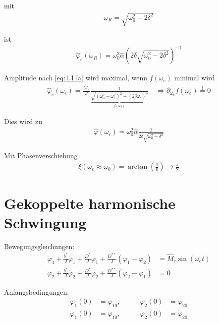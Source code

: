         mit
        \begin{align}
            \omega_R = \sqrt{\omega_0^2 - 2\delta^2}\label{eq:1.14}
        \end{align}

        ist
        \begin{align}
            \hat{\varphi}_e(\omega_R) = \omega_0^2 \hat{\alpha}\left(2\delta\sqrt{\omega_0^2 - 2\delta^2}\right)^{-1}\label{eq:1.14a}
        \end{align}

        Amplitude nach \cref{eq:1.11a} wird maximal, wenn \(f(\omega_e)\) minimal wird
        \begin{align}
            \hat{\varphi}_e(\omega_e) = \frac{\hat{M}_e}{J} \frac{1}{\underbrace{\sqrt{(\omega_0^2 - \omega_e^2)^2+(2\delta\omega_e)^2}}_{f(\omega_e)}} \quad \Rightarrow \partial_{\omega_e} f(\omega_e) \overset{!}{=} 0\nonumber
        \end{align}

        Dies wird zu
        \begin{align}
            \hat{\varphi}(\omega_e) = \omega_0^2 \hat{\alpha} \frac{1}{2\delta\sqrt{\omega_0^2-\delta^2}}\nonumber
        \end{align}

        Mit Phasenverschiebung
        \begin{align}
            \xi(\omega_e \approx \omega_0) = \arctan\left(\frac{1}{0}\right) \rightarrow \frac{\pi}{2}\nonumber
        \end{align}

    \section{Gekoppelte harmonische Schwingung}

        Bewegungsgleichungen:
        \begin{align}
            \ddot{\varphi}_1 + \frac{b^\ast}{J}\dot{\varphi}_1 + \frac{D^\ast}{J}\varphi_1 + \frac{D^{\ast\ast}}{J}(\varphi_1 - \varphi_2) &= \hat{M}_e\sin(\omega_e t)\label{eq:1.22a}\\
            \ddot{\varphi}_2 + \frac{b^\ast}{J}\dot{\varphi}_2 + \frac{D^\ast}{J}\varphi_2 + \frac{D^{\ast\ast}}{J}(\varphi_2 - \varphi_1) &= 0\label{eq:1.22b}
        \end{align}

        Anfangsbedingungen:
        \begin{align}
            \varphi_1(0) &= \varphi_{10},& \qquad \varphi_2(0) &= \varphi_{20}\\
            \dot{\varphi}_1(0) &= \dot{\varphi}_{10},& \qquad \dot{\varphi}_2(0) &= \dot{\varphi}_{20}
        \end{align}


